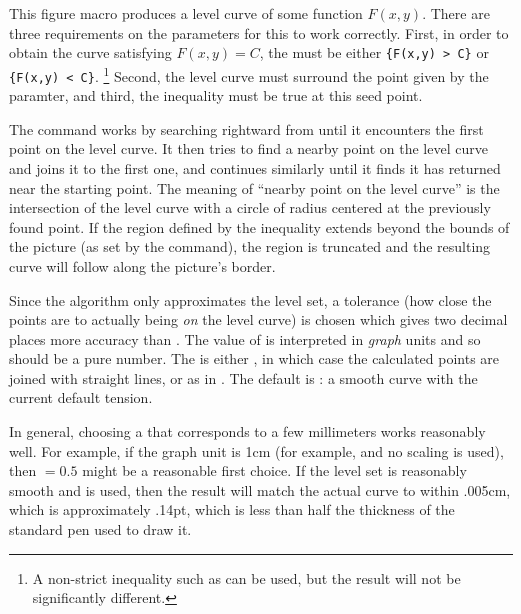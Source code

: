 \documentclass[letterpaper]{article}
\begin{document}
\begin{cd}
\end{cd}

This figure macro produces a level curve of some function $F(x,y)$.
There are three requirements on the parameters for this to work
correctly. First, in order to obtain the curve satisfying $F(x,y) = C$,
the  must be either \verb${F(x,y) > C}$ or
\verb${F(x,y) < C}$.%
   \footnote{A non-strict inequality such as \mfc{>=} can be
    used, but the result will not be significantly different.}
Second, the level curve must surround the point given by the 
paramter, and third, the inequality must be true at this seed point.

The command works by searching rightward from  until it
encounters the first point on the level curve. It then tries to find a
nearby point on the level curve and joins it to the first one, and
continues similarly until it finds it has returned near the starting
point. The meaning of ``nearby point on the level curve'' is the
intersection of the level curve with a circle of radius 
centered at the previously found point. If the region defined by the
inequality extends beyond the bounds of the picture (as set by the
 command), the region is truncated and the resulting curve
will follow along the picture's border.

Since the algorithm only approximates the level set, a tolerance (how
close the points are to actually being \emph{on} the level curve) is
chosen which gives two decimal places more accuracy than .
The value of  is interpreted in \emph{graph} units and
so should be a pure number. The  is either ,
in which case the calculated points are joined with straight lines, or
 as in . The default is
: a smooth curve with the current default tension.

In general, choosing a  that corresponds to a few millimeters
works reasonably well. For example, if the graph unit is 1cm (for
example,  and no scaling is used), then
${}= 0.5$ might be a reasonable first choice. If the level
set is reasonably smooth and  is used, then the result will
match the actual curve to within .005cm, which is approximately .14pt,
which is less than half the thickness of the standard pen used to draw
it.
\end{document}
